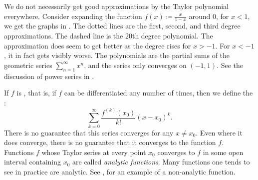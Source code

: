 We do not necessarily get good approximations
by the Taylor polynomial everywhere.
Consider expanding the function
$f(x) \coloneqq \frac{x}{1-x}$ around 0,
for $x < 1$, we get the graphs in
.  The dotted lines are the first, second, and
third degree approximations.
The dashed line is the 20th degree polynomial.
The approximation does seem to get
better as the degree rises for $x > -1$.
For $x < -1$, it in fact gets visibly worse.
The polynomials
are the partial sums of the geometric series $\sum_{n=1}^\infty x^n$,
and the series only converges on $(-1,1)$.
See the discussion of power series in
.

\begin{myfigureht}
\caption{The function $\frac{x}{1-x}$, and the Taylor polynomials
$P_1^0$, $P_2^0$, $P_3^0$ (all dotted), and the polynomial $P_{20}^0$
(dashed).\label{fig:taylorgeom}}
\end{myfigureht}

If $f$ is \emph{},
that is, if $f$ can be
differentiated any number of times, then 
we define the \emph{}:
\begin{equation*}
\sum_{k=0}^\infty
\frac{f^{(k)}(x_0)}{k!}{(x-x_0)}^k .
\end{equation*}
There is no guarantee that this series converges for any
$x \neq x_0$.  Even where it does converge, there is no guarantee
that it converges to the function $f$.  Functions $f$
whose Taylor series at every point $x_0$
converges to $f$ in some open interval containing $x_0$
are called
\emph{analytic functions}.
Many functions one tends to see in practice are analytic.
See , for an example of a non-analytic
function.

